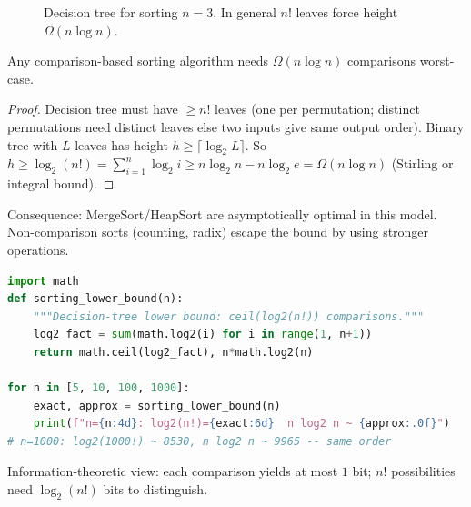 \begin{figure}[h]\centering
{}
\caption{Decision tree for sorting $n=3$. In general $n!$ leaves force height $\Omega(n\log n)$.}
\label{fig:decision-tree}
\end{figure}

\begin{theorem}
Any comparison-based sorting algorithm needs $\Omega(n\log n)$ comparisons worst-case.
\end{theorem}
\begin{proof}
Decision tree must have $\ge n!$ leaves (one per permutation; distinct permutations need distinct leaves else two inputs give same output order). Binary tree with $L$ leaves has height $h\ge\lceil\log_2 L\rceil$. So $h\ge\log_2(n!)=\sum_{i=1}^{n}\log_2 i\ge n\log_2 n-n\log_2 e=\Omega(n\log n)$ (Stirling or integral bound).
\end{proof}

Consequence: MergeSort/HeapSort are asymptotically optimal in this model. Non-comparison sorts (counting, radix) escape the bound by using stronger operations.

\begin{lstlisting}[language=Python]
import math
def sorting_lower_bound(n):
    """Decision-tree lower bound: ceil(log2(n!)) comparisons."""
    log2_fact = sum(math.log2(i) for i in range(1, n+1))
    return math.ceil(log2_fact), n*math.log2(n)

for n in [5, 10, 100, 1000]:
    exact, approx = sorting_lower_bound(n)
    print(f"n={n:4d}: log2(n!)={exact:6d}  n log2 n ~ {approx:.0f}")
# n=1000: log2(1000!) ~ 8530, n log2 n ~ 9965 -- same order
\end{lstlisting}

Information-theoretic view: each comparison yields at most $1$ bit; $n!$ possibilities need $\log_2(n!)$ bits to distinguish.


